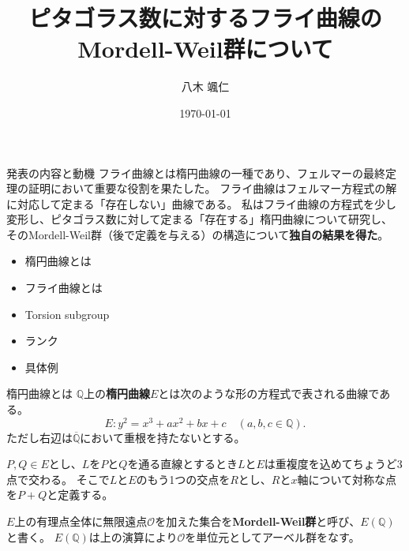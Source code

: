 \documentclass{classes/mybeamer}
\title{
    ピタゴラス数に対するフライ曲線の\\
    Mordell-Weil群について
}
\author{八木 颯仁}
\institute{慶應義塾大学 栗原研究室 修士1年}
\date{\today}
\begin{document}
\begin{frame}
    \titlepage
\end{frame}

\begin{frame}{発表の内容と動機}
    フライ曲線とは楕円曲線の一種であり、フェルマーの最終定理の証明において重要な役割を果たした。
    フライ曲線はフェルマー方程式の解に対応して定まる「存在しない」曲線である。
    私はフライ曲線の方程式を少し変形し、ピタゴラス数に対して定まる「存在する」楕円曲線について研究し、
    そのMordell-Weil群（後で定義を与える）の構造について\textbf{独自の結果を得た}。

    \vspace{1cm}

    \begin{itemize}
        \item 楕円曲線とは
        \item フライ曲線とは
        \item Torsion subgroup
        \item ランク
        \item 具体例
    \end{itemize}
\end{frame}

\begin{frame}{楕円曲線とは}
    $\mathbb{Q}$上の\color{blue}\textbf{楕円曲線}\color{black}$E$とは次のような形の方程式で表される曲線である。
    \begin{equation}
        E: y^2 = x^3 + ax^2 + bx+c \quad (a, b, c \in \mathbb{Q}).
    \end{equation}
    ただし右辺は$\overline{\mathbb{Q}}$において重根を持たないとする。

    \vspace{1cm}

    $P, Q \in E$とし、$L$を$P$と$Q$を通る直線とするとき$L$と$E$は重複度を込めてちょうど3点で交わる。
    そこで$L$と$E$のもう1つの交点を$R$とし、$R$と$x$軸について対称な点を$P+Q$と定義する。

    $E$上の有理点全体に無限遠点$\mathcal{O}$を加えた集合を\color{blue}\textbf{Mordell-Weil群}\color{black}と呼び、$E(\mathbb{Q})$と書く。
    $E(\mathbb{Q})$は上の演算により$\mathcal{O}$を単位元としてアーベル群をなす。
\end{frame}
\end{document}
